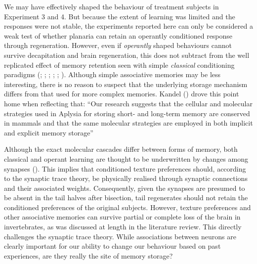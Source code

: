 \documentclass[
  jou,
  floatsintext,
  longtable,
  nolmodern,
  notxfonts,
  notimes,
  donotrepeattitle,
  colorlinks=true,linkcolor=blue,citecolor=blue,urlcolor=blue]{apa7}
\begin{document}
We may have effectively shaped the behaviour of treatment subjects in
Experiment 3 and 4. But because the extent of learning was limited and
the responses were not stable, the experiments reported here can only be
considered a weak test of whether planaria can retain an operantly
conditioned response through regeneration. However, even if
\emph{operantly} shaped behaviours cannot survive decapitation and brain
regeneration, this does not subtract from the well replicated effect of
memory retention seen with simple \emph{classical} conditioning
paradigms (;
;
;
;
;
). Although
simple associative memories may be less interesting, there is no reason
to suspect that the underlying storage mechanism differs from that used
for more complex memories. Kandel
() drove this point home when
reflecting that: ``Our research suggests that the cellular and molecular
strategies used in Aplysia for storing short- and long-term memory are
conserved in mammals and that the same molecular strategies are employed
in both implicit and explicit memory storage''

Although the exact molecular cascades differ between forms of memory,
both classical and operant learning are thought to be underwritten by
changes among synapses (). This implies that conditioned texture preferences should,
according to the synaptic trace theory, be physically realised through
synaptic connections and their associated weights. Consequently, given
the synapses are presumed to be absent in the tail halves after
bisection, tail regenerates should not retain the conditioned
preferences of the original subjects. However, texture preferences and
other associative memories can survive partial or complete loss of the
brain in invertebrates, as was discussed at length in the literature
review. This directly challenges the synaptic trace theory. While
associations between neurons are clearly important for our ability to
change our behaviour based on past experiences, are they really the site
of memory storage?
\end{document}
